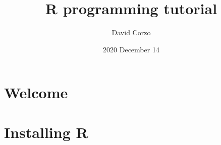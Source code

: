 \documentclass{book}
\title{R programming tutorial}
\date{2020 December 14} %
\author{David Corzo}
\begin{document}
\maketitle
\tableofcontents

\section{Welcome}


\section{Installing R}


% 

% 

% 

% 

% 

% 

% 

% 
\end{document}
